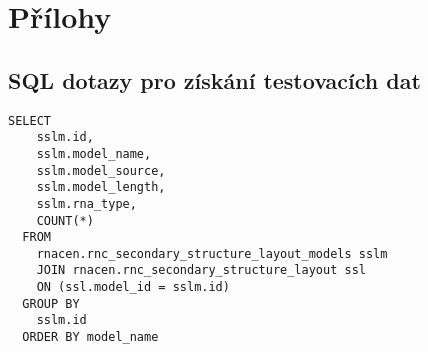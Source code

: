 \chapter{Přílohy}

\section{SQL dotazy pro získání testovacích dat}

\begin{lstlisting}[caption={SQL dotaz pro získání vzorových struktur},label=vzorsql]
  SELECT 
    sslm.id, 
    sslm.model_name, 
    sslm.model_source, 
    sslm.model_length, 
    sslm.rna_type, 
    COUNT(*)
  FROM 
    rnacen.rnc_secondary_structure_layout_models sslm 
    JOIN rnacen.rnc_secondary_structure_layout ssl 
    ON (ssl.model_id = sslm.id)
  GROUP BY
    sslm.id
  ORDER BY model_name
\end{lstlisting}


